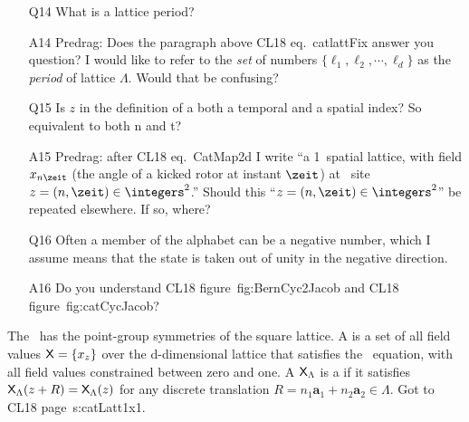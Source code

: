 \begin{description}
\begin{itemize}
	\item[Q14]
What is a lattice period?
	\item[A14]
Predrag: Does the paragraph above CL18 eq.~{catlattFix} answer you question?
I would like to refer to the \emph{set} of numbers
$\{\ell_1,\ell_2,\cdots,\ell_d\}$ as the \emph{period} of lattice
$\Lambda$. Would that be confusing?
	\item[Q15]
Is $z$ in the definition of a {\lattstate} both a temporal and a spatial index? So equivalent to both n and t?
	\item[A15]
Predrag: after CL18 eq.~{CatMap2d} I write ``a 1\dmn\ spatial
lattice, with field $\ssp_{n\zeit}$ (the angle of a kicked rotor
 at instant $\zeit$) at \spt\ site
$z=(n,\zeit)\in\integers^2$.'' Should this
``$z=(n,\zeit)\in\integers^2$'' be repeated elsewhere. If so, where?
	\item[Q16]
Often a member of the alphabet can be a negative number, which I assume
means that the state is taken out of unity in the negative direction.
	\item[A16]
Do you understand CL18 figure~{fig:BernCyc2Jacob} and CL18 figure~{fig:catCycJacob}?
\end{itemize}

The
\catlatt\ has the point-group symmetries of the square lattice.
A {\lattstate} is a set of all field values $\mathsf{X}=\{x_z\}$ over the
d-dimensional lattice that satisfies the \catlatt\ equation,
with all field values constrained between zero and one. A {\lattstate}
$\mathsf{X}_{\Lambda}$ is a \emph{\twot} if it satisfies
$\mathsf{X}_{\Lambda}(z+R)=\mathsf{X}_{\Lambda}(z)$ for any
discrete translation $R=n_1\mathbf{a}_1+n_2\mathbf{a}_2 \in \Lambda$. Got
to CL18 page~{s:catLatt1x1}.


\end{description}
